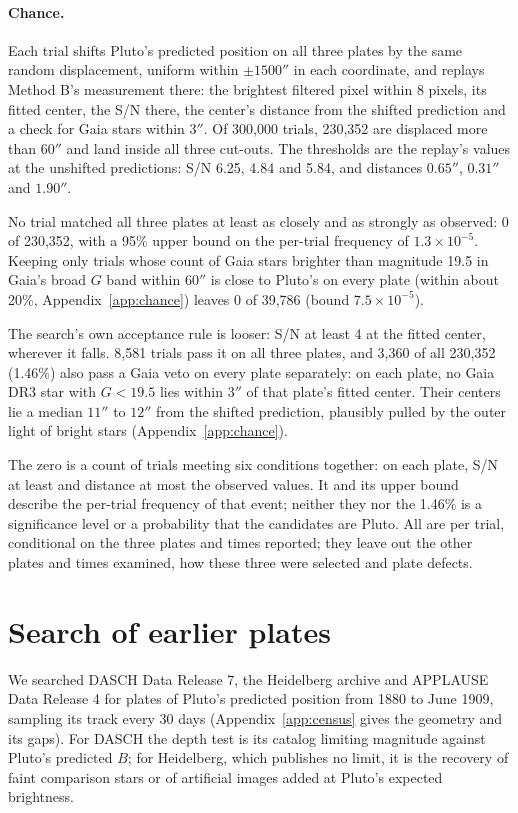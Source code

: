 \documentclass[11pt]{article}
\begin{document}
\paragraph{Chance.}
Each trial shifts Pluto's predicted position on all three plates by the same random displacement, uniform within $\pm1500''$ in each coordinate, and replays Method B's measurement there: the brightest filtered pixel within 8 pixels, its fitted center, the S/N there, the center's distance from the shifted prediction and a check for Gaia stars within $3''$. Of 300,000 trials, 230,352 are displaced more than $60''$ and land inside all three cut-outs. The thresholds are the replay's values at the unshifted predictions: S/N 6.25, 4.84 and 5.84, and distances $0.65''$, $0.31''$ and $1.90''$.

No trial matched all three plates at least as closely and as strongly as observed: 0 of 230,352, with a 95\% upper bound on the per-trial frequency of $1.3\times10^{-5}$. Keeping only trials whose count of Gaia stars brighter than magnitude 19.5 in Gaia's broad $G$ band within $60''$ is close to Pluto's on every plate (within about 20\%, Appendix~\ref{app:chance}) leaves 0 of 39,786 (bound $7.5\times10^{-5}$).

The search's own acceptance rule is looser: S/N at least 4 at the fitted center, wherever it falls. 8,581 trials pass it on all three plates, and 3,360 of all 230,352 (1.46\%) also pass a Gaia veto on every plate separately: on each plate, no Gaia DR3 star with $G<19.5$ lies within $3''$ of that plate's fitted center. Their centers lie a median $11''$ to $12''$ from the shifted prediction, plausibly pulled by the outer light of bright stars (Appendix~\ref{app:chance}).

The zero is a count of trials meeting six conditions together: on each plate, S/N at least and distance at most the observed values. It and its upper bound describe the per-trial frequency of that event; neither they nor the 1.46\% is a significance level or a probability that the candidates are Pluto. All are per trial, conditional on the three plates and times reported; they leave out the other plates and times examined, how these three were selected and plate defects.

\section{Search of earlier plates}
\label{sec:census}

We searched DASCH Data Release 7, the Heidelberg archive and APPLAUSE Data Release 4 \cite{Enke2024,APPLAUSEDR4} for plates of Pluto's predicted position from 1880 to June 1909, sampling its track every 30 days (Appendix~\ref{app:census} gives the geometry and its gaps). For DASCH the depth test is its catalog limiting magnitude against Pluto's predicted $B$; for Heidelberg, which publishes no limit, it is the recovery of faint comparison stars or of artificial images added at Pluto's expected brightness.
\end{document}
